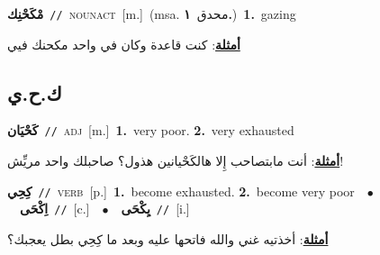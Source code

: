 \documentclass[10pt,a4paper,twoside]{article} %
\begin{document}
\begin{multicols}{2}
{\setlength\topsep{0pt}\textbf{\foreignlanguage{arabic}{مْكَحْنِك}}\ {\color{gray}\texttt{//}\color{black}}\ \textsc{noun\textunderscore act}\ [m.]\ \color{gray}(msa. \foreignlanguage{arabic}{محدق}~\foreignlanguage{arabic}{\textbf{١.}})\color{black}\ \textbf{1.}~gazing\  \begin{flushright}\color{gray}\foreignlanguage{arabic}{\textbf{\underline{\foreignlanguage{arabic}{أمثلة}}}: كنت قاعدة وكان في واحد مكحنك فيي}\end{flushright}\color{black}} \vspace{2mm}

\vspace{-3mm}
\subsection*{\color{blue}\foreignlanguage{arabic}{ك.ح.ي}\color{blue}{}} 

{\setlength\topsep{0pt}\textbf{\foreignlanguage{arabic}{كَحْيَان}}\ {\color{gray}\texttt{//}\color{black}}\ \textsc{adj}\ [m.]\ \textbf{1.}~very poor.  \textbf{2.}~very exhausted\  \begin{flushright}\color{gray}\foreignlanguage{arabic}{\textbf{\underline{\foreignlanguage{arabic}{أمثلة}}}: أنت مابتصاحب إِلا هالكَحْيانين هذول؟ صاحبلك واحد مريِّش!}\end{flushright}\color{black}} \vspace{2mm}

{\setlength\topsep{0pt}\textbf{\foreignlanguage{arabic}{كِحِي}}\ {\color{gray}\texttt{//}\color{black}}\ \textsc{verb}\ [p.]\ \textbf{1.}~become exhausted.  \textbf{2.}~become very poor\ \ $\bullet$\ \ \setlength\topsep{0pt}\textbf{\foreignlanguage{arabic}{اِكْحَى}}\ {\color{gray}\texttt{//}\color{black}}\ [c.]\ \ $\bullet$\ \ \setlength\topsep{0pt}\textbf{\foreignlanguage{arabic}{يِكْحَى}}\ {\color{gray}\texttt{//}\color{black}}\ [i.]\  \begin{flushright}\color{gray}\foreignlanguage{arabic}{\textbf{\underline{\foreignlanguage{arabic}{أمثلة}}}: أخذتيه غني والله فاتحها عليه وبعد ما كِحِي بطل يعجبك؟}\end{flushright}\color{black}} \vspace{2mm}


\end{multicols}
\end{document}
